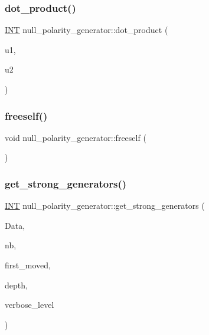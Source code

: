 \subsubsection{\texorpdfstring{dot\+\_\+product()}{dot\_product()}}
{\footnotesize\ttfamily \mbox{\hyperlink{galois_8h_a09fddde158a3a20bd2dcadb609de11dc}{I\+NT}} null\+\_\+polarity\+\_\+generator\+::dot\+\_\+product (\begin{DoxyParamCaption}\item[{\mbox{\hyperlink{galois_8h_a09fddde158a3a20bd2dcadb609de11dc}{I\+NT}} $\ast$}]{u1,  }\item[{\mbox{\hyperlink{galois_8h_a09fddde158a3a20bd2dcadb609de11dc}{I\+NT}} $\ast$}]{u2 }\end{DoxyParamCaption})}

\mbox{\label{classnull__polarity__generator_a5e26037d889fb90c896eea1e86a14598}} 
\subsubsection{\texorpdfstring{freeself()}{freeself()}}
{\footnotesize\ttfamily void null\+\_\+polarity\+\_\+generator\+::freeself (\begin{DoxyParamCaption}{ }\end{DoxyParamCaption})}

\mbox{\label{classnull__polarity__generator_a666d587704898cfe3a38b24af1a7052c}} 
\subsubsection{\texorpdfstring{get\+\_\+strong\+\_\+generators()}{get\_strong\_generators()}}
{\footnotesize\ttfamily \mbox{\hyperlink{galois_8h_a09fddde158a3a20bd2dcadb609de11dc}{I\+NT}} null\+\_\+polarity\+\_\+generator\+::get\+\_\+strong\+\_\+generators (\begin{DoxyParamCaption}\item[{\mbox{\hyperlink{galois_8h_a09fddde158a3a20bd2dcadb609de11dc}{I\+NT}} $\ast$}]{Data,  }\item[{\mbox{\hyperlink{galois_8h_a09fddde158a3a20bd2dcadb609de11dc}{I\+NT}} \&}]{nb,  }\item[{\mbox{\hyperlink{galois_8h_a09fddde158a3a20bd2dcadb609de11dc}{I\+NT}} \&}]{first\+\_\+moved,  }\item[{\mbox{\hyperlink{galois_8h_a09fddde158a3a20bd2dcadb609de11dc}{I\+NT}}}]{depth,  }\item[{\mbox{\hyperlink{galois_8h_a09fddde158a3a20bd2dcadb609de11dc}{I\+NT}}}]{verbose\+\_\+level }\end{DoxyParamCaption})}

